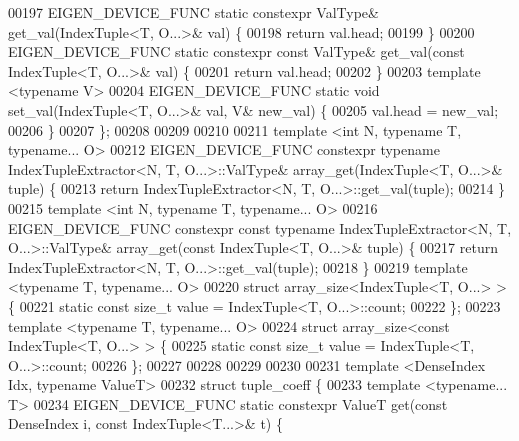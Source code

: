 \begin{DoxyCode}
00197   EIGEN\_DEVICE\_FUNC \textcolor{keyword}{static} constexpr ValType& get\_val(IndexTuple<T, O...>& val) \{
00198     \textcolor{keywordflow}{return} val.head;
00199   \}
00200   EIGEN\_DEVICE\_FUNC \textcolor{keyword}{static} constexpr \textcolor{keyword}{const} ValType& get\_val(\textcolor{keyword}{const} IndexTuple<T, O...>& val) \{
00201     \textcolor{keywordflow}{return} val.head;
00202   \}
00203   \textcolor{keyword}{template} <\textcolor{keyword}{typename} V>
00204   EIGEN\_DEVICE\_FUNC \textcolor{keyword}{static} \textcolor{keywordtype}{void} set\_val(IndexTuple<T, O...>& val, V& new\_val) \{
00205     val.head = new\_val;
00206   \}
00207 \};
00208 
00209 
00210 
00211 \textcolor{keyword}{template} <\textcolor{keywordtype}{int} N, \textcolor{keyword}{typename} T, \textcolor{keyword}{typename}... O>
00212 EIGEN\_DEVICE\_FUNC constexpr \textcolor{keyword}{typename} IndexTupleExtractor<N, T, O...>::ValType& array\_get(IndexTuple<T,
       O...>& tuple) \{
00213   \textcolor{keywordflow}{return} IndexTupleExtractor<N, T, O...>::get\_val(tuple);
00214 \}
00215 \textcolor{keyword}{template} <\textcolor{keywordtype}{int} N, \textcolor{keyword}{typename} T, \textcolor{keyword}{typename}... O>
00216 EIGEN\_DEVICE\_FUNC constexpr \textcolor{keyword}{const} \textcolor{keyword}{typename} IndexTupleExtractor<N, T, O...>::ValType& array\_get(\textcolor{keyword}{const} 
      IndexTuple<T, O...>& tuple) \{
00217   \textcolor{keywordflow}{return} IndexTupleExtractor<N, T, O...>::get\_val(tuple);
00218 \}
00219 \textcolor{keyword}{template} <\textcolor{keyword}{typename} T, \textcolor{keyword}{typename}... O>
00220   \textcolor{keyword}{struct }array\_size<IndexTuple<T, O...> > \{
00221   \textcolor{keyword}{static} \textcolor{keyword}{const} \textcolor{keywordtype}{size\_t} value = IndexTuple<T, O...>::count;
00222 \};
00223 \textcolor{keyword}{template} <\textcolor{keyword}{typename} T, \textcolor{keyword}{typename}... O>
00224   \textcolor{keyword}{struct }array\_size<const IndexTuple<T, O...> > \{
00225   \textcolor{keyword}{static} \textcolor{keyword}{const} \textcolor{keywordtype}{size\_t} value = IndexTuple<T, O...>::count;
00226 \};
00227 
00228 
00229 
00230 
00231 \textcolor{keyword}{template} <DenseIndex Idx, \textcolor{keyword}{typename} ValueT>
00232 \textcolor{keyword}{struct }tuple\_coeff \{
00233   \textcolor{keyword}{template} <\textcolor{keyword}{typename}... T>
00234   EIGEN\_DEVICE\_FUNC \textcolor{keyword}{static} constexpr ValueT \textcolor{keyword}{get}(\textcolor{keyword}{const} DenseIndex i, \textcolor{keyword}{const} IndexTuple<T...>& t) \{

\end{DoxyCode}
